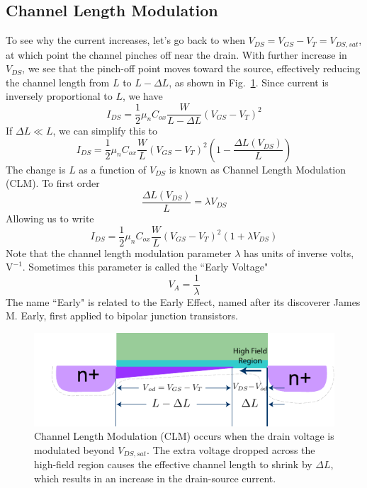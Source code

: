 \subsection{Channel Length Modulation} \label{sec:mos_clm}

To see why the current increases, let's go back to when $V_{DS} = V_{GS} - V_T = V_{DS,sat}$, at which point the channel pinches off near the drain. With further increase in $V_{DS}$, we see that the pinch-off point moves toward the source, effectively reducing the channel length from $L$ to $L-\Delta L$, as shown in Fig.~\ref{fig:mos_current_sat_clm}.  Since current is inversely proportional to $L$, we have
%
\begin{equation} 
	I_{DS} = \frac{1}{2}{\mu _n}{C_{ox}}\frac{W}{{L - \Delta L}}{\left( {{V_{GS}} - {V_T}} \right)^2} 
\end{equation}
If $\Delta L \ll L$, we can simplify this to 
\begin{equation} 
	I_{DS} = \frac{1}{2}{\mu _n}{C_{ox}}\frac{W}{L}{\left( {{V_{GS}} - {V_T}} \right)^2}  \left(1 - \frac{\Delta L(V_{DS})}{L} \right)
\end{equation}
The change is $L$ as a function of $V_{DS}$ is known as Channel Length Modulation (CLM).  To first order
\begin{equation} 
	 \frac{\Delta L(V_{DS})}{L} = \lambda V_{DS}
\end{equation}
Allowing us to write
%
\begin{equation} 
	I_{DS} = \frac{1}{2}{\mu _n}{C_{ox}}\frac{W}{L}{\left( {{V_{GS}} - {V_T}} \right)^2}\left( {1 + \lambda {V_{DS}}} \right) 
\end{equation}
%
Note that the channel length modulation parameter $\lambda$ has units of inverse volts, $\mathrm{V^{-1}}$.  Sometimes this parameter is called the ``Early Voltage" 
%
\begin{equation} 
	V_A = \frac{1}{\lambda}
\end{equation}
%
The name ``Early" is related to the Early Effect, named after its discoverer James M. Early, first applied to bipolar junction transistors.  


\begin{figure}[tb]
\begin{center}
\includegraphics[width=.75\columnwidth]{mos_current_sat_clm}
\end{center}
\caption{Channel Length Modulation (CLM) occurs when the drain voltage is modulated beyond $V_{DS,sat}$.  The extra voltage dropped across the high-field region causes the effective channel length to shrink by $\Delta L$, which results in an increase in the drain-source current. } \label{fig:mos_current_sat_clm}
\end{figure}






